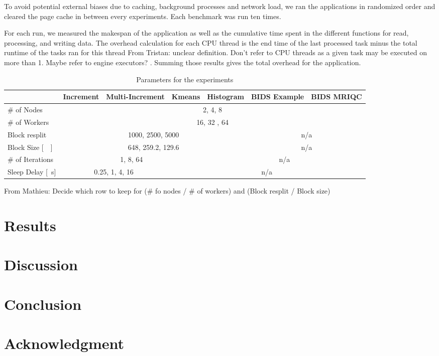 \documentclass[conference]{IEEEtran}
\newcommand{\TG}[1]{\color{cyan}From Tristan: #1 \color{black}}
\newcommand{\MD}[1]{\color{magenta}From Mathieu: #1 \color{black}}
\begin{document}
To avoid potential external biases due to caching, background processes and
network load, we ran the applications in randomized order and cleared the
page cache in between every experiments. Each benchmark was run ten times.

For each run, we measured the makespan of the application as well as the
cumulative time spent in the different functions for read, processing, and
writing data. The overhead calculation for each CPU thread is the end time
of the last processed task minus the total runtime of the tasks ran for
this thread \TG{unclear definition. Don't refer to CPU threads as a given task may be executed on more than 1. Maybe refer to engine executors?}. Summing those results gives the total overhead for the
application.

\begin{table}[t]
	\renewcommand{\arraystretch}{1.5}
	\caption{Parameters for the experiments}\label{table:parameters}
	\centering
	\begin{tabular}{|l|c|c|c|c|c|c|}
		\hline & Increment & Multi-Increment & Kmeans & Histogram & BIDS Example & BIDS MRIQC \\\hline
		\# of Nodes & \multicolumn{6}{c|}{2, 4, 8} \\\hline
		\# of Workers & \multicolumn{6}{c|}{16, 32 , 64} \\ \hline
		Block resplit & \multicolumn{4}{c|}{1000, 2500, 5000}  & \multicolumn{2}{c|}{n/a} \\\hline
		Block Size {[}\SI{}{\mega\byte}{]} & \multicolumn{4}{c|}{648, 259.2, 129.6} & \multicolumn{2}{c|}{n/a} \\\hline
		\# of Iterations & \multicolumn{3}{c|}{1, 8, 64}                 & \multicolumn{3}{c|}{n/a} \\\hline
		Sleep Delay {[}\SI{}{\second}{]} & \multicolumn{2}{c|}{0.25, 1, 4, 16} & \multicolumn{4}{c|}{n/a} \\\hline
	\end{tabular}
\end{table}
\MD{Decide which row to keep for (\# fo nodes / \# of workers) and (Block resplit / Block size)}

\section{Results} %
\section{Discussion} %
\section{Conclusion} %
\section*{Acknowledgment} %



\end{document}
